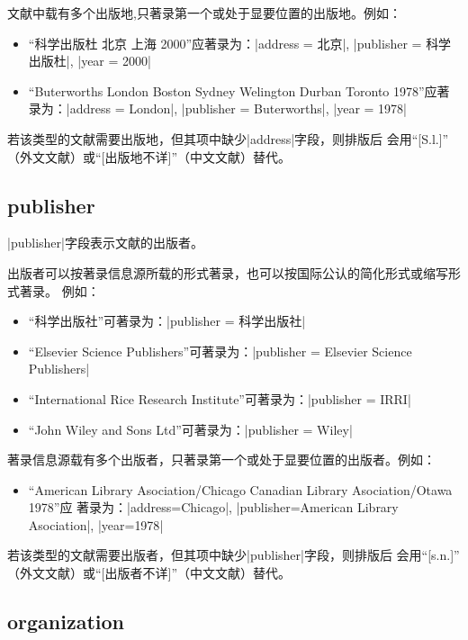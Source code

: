 文献中载有多个出版地,只著录第一个或处于显要位置的出版地。例如：
\begin{itemize}
\item ``科学出版杜 北京 上海 2000''应著录为：|address = {北京}|, 
  |publisher = {科学出版杜}|, |year = {2000}|
\item ``Buterworths London Boston Sydney Welington Durban Toronto 1978''应著
  录为：|address = {London}|, |publisher = {Buterworths}|, |year = {1978}|
\end{itemize}

若该类型的文献需要出版地，但其{\BibTeX}项中缺少|address|字段，则{\BibTeX}排版后
会用``[S.l.]'' （外文文献）或``[出版地不详]''（中文文献）替代。

\subsection{publisher}\label{subsec:bibfield-publisher}

|publisher|字段表示文献的出版者。

出版者可以按著录信息源所载的形式著录，也可以按国际公认的简化形式或缩写形式著录。
例如：
\begin{itemize}
\item ``科学出版社''可著录为：|publisher = {科学出版社}|
\item ``Elsevier Science Publishers''可著录为：|publisher = {Elsevier Science Publishers}|
\item ``International Rice Research Institute''可著录为：|publisher = {IRRI}|
\item ``John Wiley and Sons Ltd''可著录为：|publisher = {Wiley}|
\end{itemize}

著录信息源载有多个出版者，只著录第一个或处于显要位置的出版者。例如：
\begin{itemize}
\item ``American Library Asociation/Chicago Canadian Library Asociation/Otawa 1978''应
    著录为：|address={Chicago}|, |publisher={American Library Asociation}|, |year={1978}|
\end{itemize}

若该类型的文献需要出版者，但其{\BibTeX}项中缺少|publisher|字段，则{\BibTeX}排版后
会用``[s.n.]'' （外文文献）或``[出版者不详]''（中文文献）替代。

\subsection{organization}\label{subsec:bibfield-organization}

